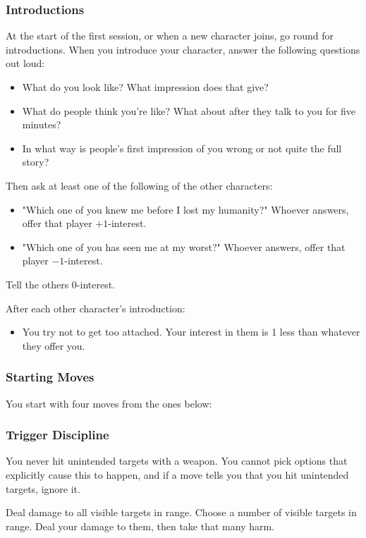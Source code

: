 \subsubsection{Introductions}
At the start of the first session, or when a new character joins, go round for introductions.
When you introduce your character, answer the following questions out loud:
\begin{itemize}
\item What do you look like? What impression does that give?
\item What do people think you're like? What about after they talk to you for five minutes?
\item In what way is people's first impression of you wrong or not quite the full story?
\end{itemize}

Then ask at least one of the following of the other characters:
\begin{itemize}
\item "Which one of you knew me before I lost my humanity?" Whoever answers, offer that player $+1$-interest.
\item "Which one of you has seen me at my worst?" Whoever answers, offer that player $-1$-interest.
\end{itemize}
Tell the others 0-interest.

After each other character's introduction:
\begin{itemize}
\item You try not to get too attached. Your interest in them is 1 less than whatever they offer you.
\end{itemize}

\subsubsection{Starting Moves}
You start with four moves from the ones below:

\subsubsection{Trigger Discipline} You never hit unintended targets with a weapon. You cannot pick options that explicitly cause this to happen, and if a move tells you that you hit unintended targets, ignore it.

{Deal damage to all visible targets in range.}
{Choose a number of visible targets in range. Deal your damage to them, then take that many harm.}

